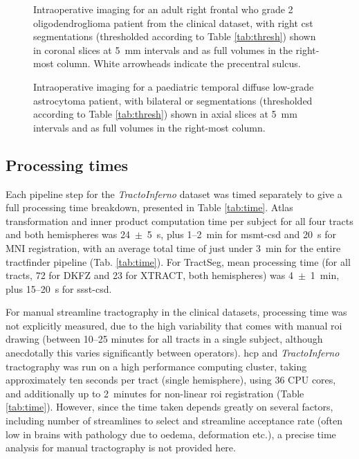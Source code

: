 \begin{figure}[htb!]
  \makebox[\linewidth][r]{%
  }
  \caption[CST segmentations in all benchmark evaluation methods for an adult intraoperative case in the clinical dataset]{Intraoperative imaging for an adult right frontal \gls{who} grade 2 oligodendroglioma patient from the clinical dataset, with right \gls{cst} segmentations (thresholded according to Table \ref{tab:thresh}) shown in coronal slices at 5~mm intervals and as full volumes in the right-most column. White arrowheads indicate the precentral sulcus.}
  \label{fig:lb.nh}
\end{figure}
\begin{figure}[htb!]
  \makebox[\linewidth][r]{%
  }
  \caption[OR segmentations in all benchmark evaluation methods for a paediatric intraoperative case in the clinical dataset]{Intraoperative imaging for a paediatric temporal diffuse low-grade astrocytoma patient, with bilateral \gls{or} segmentations (thresholded according to Table \ref{tab:thresh}) shown in axial slices at 5~mm intervals and as full volumes in the right-most column.}
  \label{fig:lb.gosh}
\end{figure}


\subsection{Processing times}

Each pipeline step for the \textit{TractoInferno} dataset was timed separately to give a full processing time breakdown, presented in Table \ref{tab:time}.
Atlas transformation and inner product computation time per subject for all four tracts and both hemispheres was 24~$\pm$~5~s, plus 1--2~min for \gls{msmt}-\gls{csd} and 20~s for MNI registration, with an average total time of just under 3~min for the entire tractfinder pipeline (Tab. \ref{tab:time}).
For TractSeg, mean processing time (for all tracts, 72 for DKFZ and 23 for XTRACT, both hemispheres) was 4~$\pm$~1~min, plus 15--20~s for \gls{ssst}-\gls{csd}.

For manual streamline tractography in the clinical datasets, processing time was not explicitly measured, due to the high variability that comes with manual \gls{roi} drawing (between 10--25 minutes for all tracts in a single subject, although anecdotally this varies significantly between operators).
\Gls{hcp} and \textit{TractoInferno} tractography was run on a high performance computing cluster, taking approximately ten seconds per tract (single hemisphere), using 36 CPU cores, and additionally up to 2~minutes for non-linear \gls{roi} registration (Table \ref{tab:time}).
However, since the time taken depends greatly on several factors, including number of streamlines to select and streamline acceptance rate (often low in brains with pathology due to oedema, deformation etc.), a precise time analysis for manual tractography is not provided here.


